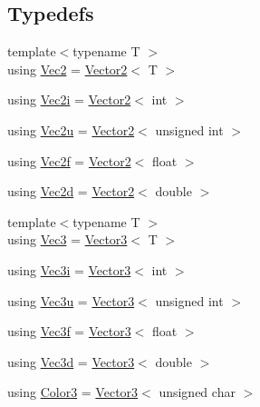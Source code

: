 \subsection*{Typedefs}
\begin{DoxyCompactItemize}
\item 
{\footnotesize template$<$typename T $>$ }\\using \mbox{\hyperlink{namespacepad_1_1math_a9773bcf81aa2ddd829bc327d822c6552}{Vec2}} = \mbox{\hyperlink{structpad_1_1math_1_1_vector2}{Vector2}}$<$ T $>$
\item 
using \mbox{\hyperlink{namespacepad_1_1math_a808a631a6bccd994f9589d7fb86bad41}{Vec2i}} = \mbox{\hyperlink{structpad_1_1math_1_1_vector2}{Vector2}}$<$ int $>$
\item 
using \mbox{\hyperlink{namespacepad_1_1math_ab13dd37cee5ea5816af695f75c85f6c3}{Vec2u}} = \mbox{\hyperlink{structpad_1_1math_1_1_vector2}{Vector2}}$<$ unsigned int $>$
\item 
using \mbox{\hyperlink{namespacepad_1_1math_ab0803f135ddbb0a7bd40161ac33fe108}{Vec2f}} = \mbox{\hyperlink{structpad_1_1math_1_1_vector2}{Vector2}}$<$ float $>$
\item 
using \mbox{\hyperlink{namespacepad_1_1math_abd85fd80e659deccc912cdeb3ac642c6}{Vec2d}} = \mbox{\hyperlink{structpad_1_1math_1_1_vector2}{Vector2}}$<$ double $>$
\item 
{\footnotesize template$<$typename T $>$ }\\using \mbox{\hyperlink{namespacepad_1_1math_ad878ee274f48f47da283bb61ecef9f3d}{Vec3}} = \mbox{\hyperlink{structpad_1_1math_1_1_vector3}{Vector3}}$<$ T $>$
\item 
using \mbox{\hyperlink{namespacepad_1_1math_acccfc4afcdb1f72c6881e0e74078eb7b}{Vec3i}} = \mbox{\hyperlink{structpad_1_1math_1_1_vector3}{Vector3}}$<$ int $>$
\item 
using \mbox{\hyperlink{namespacepad_1_1math_ad75d374d51ed67887ddde9d2111e69fd}{Vec3u}} = \mbox{\hyperlink{structpad_1_1math_1_1_vector3}{Vector3}}$<$ unsigned int $>$
\item 
using \mbox{\hyperlink{namespacepad_1_1math_ac2c67cf958d2b7d769b35022eb197757}{Vec3f}} = \mbox{\hyperlink{structpad_1_1math_1_1_vector3}{Vector3}}$<$ float $>$
\item 
using \mbox{\hyperlink{namespacepad_1_1math_ac1dd5a09fe437a7bd40f196b509932f2}{Vec3d}} = \mbox{\hyperlink{structpad_1_1math_1_1_vector3}{Vector3}}$<$ double $>$
\item 
using \mbox{\hyperlink{namespacepad_1_1math_ad0244d86222db9a7e50a7996b8328674}{Color3}} = \mbox{\hyperlink{structpad_1_1math_1_1_vector3}{Vector3}}$<$ unsigned char $>$

\end{DoxyCompactItemize}
